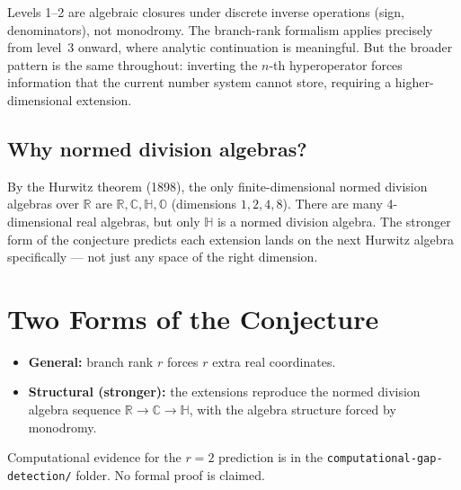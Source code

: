 \documentclass[11pt]{article}
\begin{document}
Levels 1--2 are algebraic closures under discrete inverse operations
(sign, denominators), not monodromy. The branch-rank formalism applies
precisely from level~3 onward, where analytic continuation is
meaningful. But the broader pattern is the same throughout: inverting
the $n$-th hyperoperator forces information that the current number
system cannot store, requiring a higher-dimensional extension.

\subsection*{Why normed division algebras?}

By the Hurwitz theorem (1898), the only finite-dimensional normed
division algebras over $\mathbb{R}$ are $\mathbb{R},\mathbb{C},
\mathbb{H},\mathbb{O}$ (dimensions $1,2,4,8$). There are many
4-dimensional real algebras, but only $\mathbb{H}$ is a normed
division algebra. The stronger form of the conjecture predicts each
extension lands on the next Hurwitz algebra specifically --- not just
any space of the right dimension.

\section{Two Forms of the Conjecture}

\begin{itemize}
\item \textbf{General:} branch rank $r$ forces $r$ extra real coordinates.
\item \textbf{Structural (stronger):} the extensions reproduce the normed
      division algebra sequence
      $\mathbb{R}\to\mathbb{C}\to\mathbb{H}$, with the algebra
      structure forced by monodromy.
\end{itemize}

Computational evidence for the $r=2$ prediction is in the
\texttt{computational-gap-detection/} folder. No formal proof is claimed.
\end{document}
